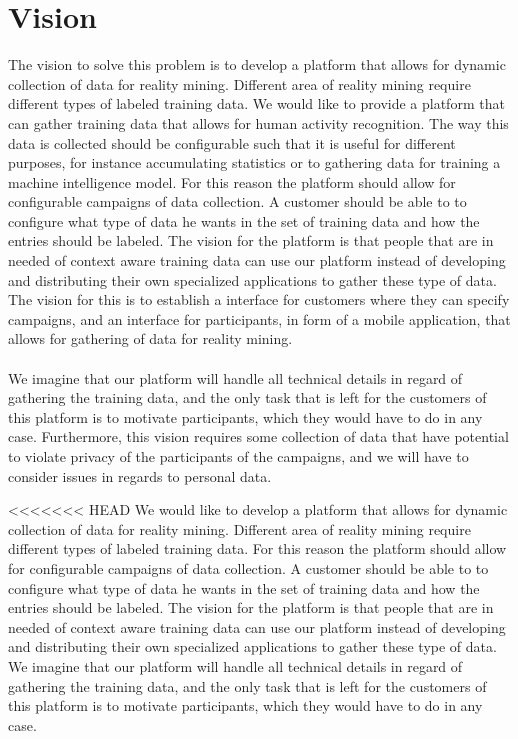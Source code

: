 \section{Vision}
\label{sec:vision}
The vision to solve this problem is to develop a platform that allows for dynamic collection of data for reality mining. Different area of reality mining require different types of labeled training data. We would like to provide a platform that can gather training data that allows for human activity recognition. The way this data is collected should be configurable such that it is useful for different purposes, for instance accumulating statistics or to gathering data for training a machine intelligence model. For this reason the platform should allow for configurable campaigns of data collection. A customer should be able to to configure what type of data he wants in the set of training data and how the entries should be labeled. The vision for the platform is that people that are in needed of context aware training data can use our platform instead of developing and distributing their own specialized applications to gather these type of data. The vision for this is to establish a interface for customers where they can specify campaigns, and an interface for participants, in form of a mobile application, that allows for gathering of data for reality mining.
\\\\
We imagine that our platform will handle all technical details in regard of gathering the training data, and the only task that is left for the customers of this platform is to motivate participants, which they would have to do in any case. Furthermore, this vision requires some collection of data that have potential to violate privacy of the participants of the campaigns, and we will have to consider issues in regards to personal data.

<<<<<<< HEAD
We would like to develop a platform that allows for dynamic collection of data for reality mining. Different area of reality mining require different types of labeled training data. For this reason the platform should allow for configurable campaigns of data collection. A customer should be able to to configure what type of data he wants in the set of training data and how the entries should be labeled. The vision for the platform is that people that are in needed of context aware training data can use our platform instead of developing and distributing their own specialized applications to gather these type of data. We imagine that our platform will handle all technical details in regard of gathering the training data, and the only task that is left for the customers of this platform is to motivate participants, which they would have to do in any case.

